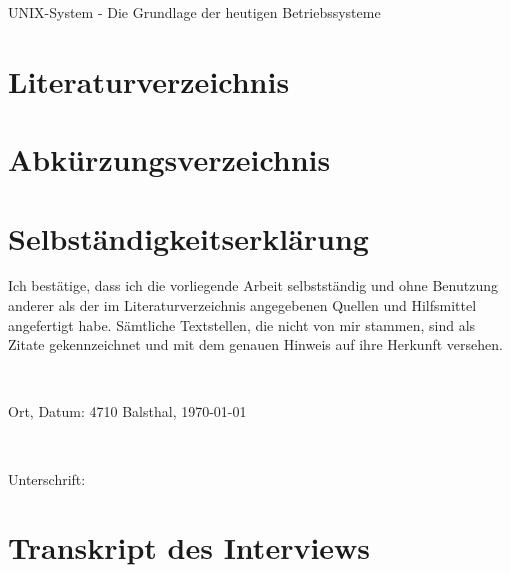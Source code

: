 \documentclass[a4paper, 11pt]{article}
\begin{document}
    \begin{titlepage}
        \centering
        \vspace*{120pt}
        \LARGE UNIX-System - Die Grundlage der heutigen Betriebssysteme \par
        \vspace{0.5cm}
        \Large \subtitle{wissenschaftliche Arbeit} \par
        \vfill
    \end{titlepage}
    \newpage


    
    \newpage


    \tableofcontents
    \newpage


    
    \newpage


    
    \newpage


    
    \newpage


    
    \newpage


    
    \newpage


    
    \newpage


    \section{Literaturverzeichnis}
    \printbibliography[heading=none]
    \nocite{*}

    \vspace{70pt}

    \section{Abkürzungsverzeichnis}
    
    \vspace{-80pt}
    \renewcommand{\glossaryname}{}
    \glsaddall
    \printglossary[nonumberlist]
    \newpage


    \section{Selbständigkeitserklärung}
    Ich bestätige, dass ich die vorliegende Arbeit selbstständig und ohne Benutzung anderer als der im Literaturverzeichnis angegebenen Quellen und Hilfsmittel angefertigt habe.
    Sämtliche Textstellen, die nicht von mir stammen, sind als Zitate gekennzeichnet und mit dem genauen Hinweis auf ihre Herkunft versehen.

    \

    Ort, Datum: \hspace{120pt} 4710 Balsthal, \today

    \

    Unterschrift:
    \newpage


    \appendix
    \section{Transkript des Interviews}
    
\end{document}
